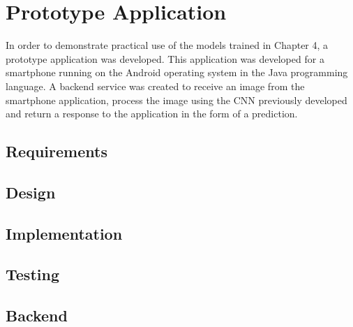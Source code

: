 \chapter{Prototype Application}
\label{prototype}
In order to demonstrate practical use of the models trained in Chapter 4, a prototype application was developed.
This application was developed for a smartphone running on the Android operating system in the Java programming language.
A backend service was created to receive an image from the smartphone
application, process the image using the CNN previously developed and return a
response to the application in the form of a prediction.

\section{Requirements}


\section{Design}


\section{Implementation}


\section{Testing}


\section{Backend}

